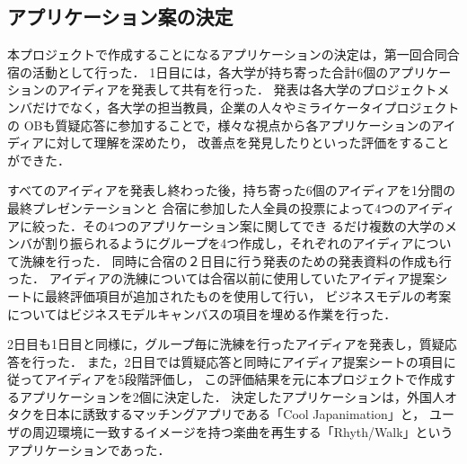 \subsection{アプリケーション案の決定}

\par
本プロジェクトで作成することになるアプリケーションの決定は，第一回合同合宿の活動として行った．
1日目には，各大学が持ち寄った合計6個のアプリケーションのアイディアを発表して共有を行った．
発表は各大学のプロジェクトメンバだけでなく，各大学の担当教員，企業の人々やミライケータイプロジェクトの
OBも質疑応答に参加することで，様々な視点から各アプリケーションのアイディアに対して理解を深めたり，
改善点を発見したりといった評価をすることができた．

\par
すべてのアイディアを発表し終わった後，持ち寄った6個のアイディアを1分間の最終プレゼンテーションと
合宿に参加した人全員の投票によって4つのアイディアに絞った．その4つのアプリケーション案に関してでき
るだけ複数の大学のメンバが割り振られるようにグループを4つ作成し，それぞれのアイディアについて洗練を行った．
同時に合宿の２日目に行う発表のための発表資料の作成も行った．
アイディアの洗練については合宿以前に使用していたアイディア提案シートに最終評価項目が追加されたものを使用して行い，
ビジネスモデルの考案についてはビジネスモデルキャンバスの項目を埋める作業を行った．

\par
2日目も1日目と同様に，グループ毎に洗練を行ったアイディアを発表し，質疑応答を行った．
また，2日目では質疑応答と同時にアイディア提案シートの項目に従ってアイディアを5段階評価し，
この評価結果を元に本プロジェクトで作成するアプリケーションを2個に決定した．
決定したアプリケーションは，外国人オタクを日本に誘致するマッチングアプリである「Cool Japanimation」と，
ユーザの周辺環境に一致するイメージを持つ楽曲を再生する「Rhyth/Walk」というアプリケーションであった．
